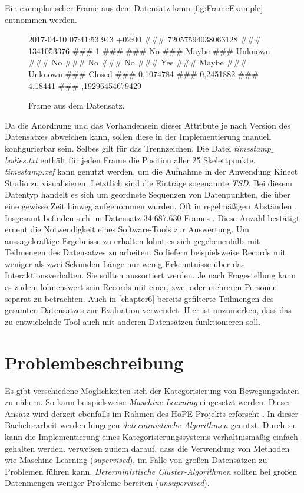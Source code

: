 Ein exemplarischer Frame aus dem Datensatz kann \autoref{fig:FrameExample} entnommen werden.
\begin{center}
  \begin{figure}[ht]
    2017-04-10 07:41:53.943 +02:00 \#\#\# 72057594038063128 \#\#\# 1341053376 \#\#\# 1 \#\#\#
     \#\#\# No \#\#\# Maybe \#\#\# Unknown \#\#\# No \#\#\# No \#\#\# No \#\#\# Yes \#\#\#
    \newline Maybe \#\#\# Unknown \#\#\# Closed \#\#\# 0,1074784 \#\#\# 0,2451882 \#\#\# 4,18441 \#\#\#
    ,19296454679429
    \caption{Frame aus dem Datensatz.}
    \label{fig:FrameExample}
  \end{figure}
\end{center}
Da die Anordnung und das Vorhandensein dieser Attribute je nach Version des Datensatzes abweichen kann,
sollen diese in der Implementierung manuell konfigurierbar sein.
Selbes gilt für das Trennzeichen.
Die Datei \emph{timestamp$\_$bodies.txt} enthält für jeden Frame die Position aller 25 Skelettpunkte.
\emph{timestamp.xef} kann genutzt werden, um die Aufnahme in der Anwendung Kinect Studio zu visualisieren.
Letztlich sind die Einträge sogenannte \emph{\ac{TSD}}.
Bei diesem Datentyp handelt es sich um geordnete Sequenzen von Datenpunkten,
die über eine gewisse Zeit hinweg aufgenommen wurden.
Oft in regelmäßigen Abständen \citep{ali_clustering_2019}.
Insgesamt befinden sich im Datensatz 34.687.630 Frames \citep{temiz_konzeption_2022}.
Diese Anzahl bestätigt erneut die Notwendigkeit eines Software-Tools zur Auswertung.
Um aussagekräftige Ergebnisse zu erhalten lohnt es sich gegebenenfalls mit Teilmengen des Datensatzes zu arbeiten.
So liefern beispielsweise Records mit weniger als zwei Sekunden Länge nur wenig Erkenntnisse über das Interaktionsverhalten.
Sie sollten aussortiert werden.
Je nach Fragestellung kann es zudem lohnenswert sein Records mit einer, zwei oder mehreren Personen
separat zu betrachten.
Auch in \autoref{chapter6} bereits gefilterte Teilmengen des gesamten Datensatzes zur Evaluation verwendet.
Hier ist anzumerken, dass das zu entwickelnde Tool auch mit anderen Datensätzen funktionieren soll.

\section{Problembeschreibung}
\label{2-Problembeschreibung}
Es gibt verschiedene Möglichkeiten sich der Kategorisierung von Bewegungsdaten zu nähern.
So kann beispielsweise \emph{Maschine Learning} eingesetzt werden.
Dieser Ansatz wird derzeit ebenfalls im Rahmen des HoPE-Projekts erforscht \citep{plischke_master_2022}.
In dieser Bachelorarbeit werden hingegen \emph{deterministische Algorithmen} genutzt.
Durch sie kann die Implementierung eines Kategorisierungssystems verhältnismäßig einfach gehalten werden.
\citet{aghabozorgi_time-series_2015} verweisen zudem darauf, dass die Verwendung von Methoden
wie Maschine Learning (\emph{supervised}), im Falle von großen Datensätzen zu Problemen führen kann.
\emph{Deterministische Cluster-Algorithmen} sollten bei großen Datenmengen weniger Probleme bereiten (\emph{unsupervised}).

